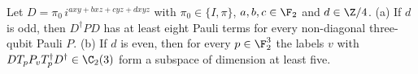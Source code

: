 Let $D=\pi_0\,i^{axy+bxz+cyz+dxyz}$ with $\pi_0\in\{I,\pi\}$, $a,b,c\in\F_2$ and $d\in\Z/4$. (a) If $d$ is odd, then $D^\dagger PD$ has at least eight Pauli terms for every non-diagonal three-qubit Pauli $P$. (b) If $d$ is even, then for every $p\in\F_2^3$ the labels $v$ with $DT_pP_vT_p^\dagger D^\dagger\in\C_2(3)$ form a subspace of dimension at least five.
